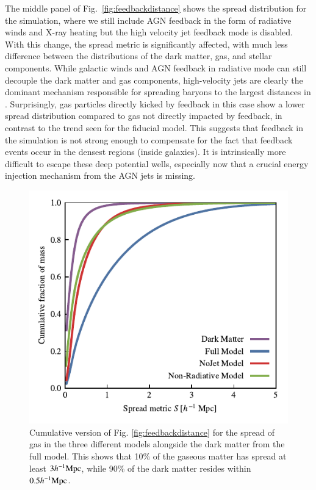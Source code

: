 The middle panel of Fig.~\ref{fig:feedbackdistance} shows the spread
distribution for the \nojet{} simulation, where we still include AGN feedback
in the form of radiative winds and X-ray heating but the high velocity jet
feedback mode is disabled. With this change, the spread metric is
significantly affected, with much less difference between the distributions
of the dark matter, gas, and stellar components. While galactic winds and AGN
feedback in radiative mode can still decouple the dark matter and gas
components, high-velocity jets are clearly the dominant mechanism responsible
for spreading baryons to the largest distances in \simba{}. Surprisingly, gas
particles directly kicked by feedback in this case show a lower spread
distribution compared to gas not directly impacted by feedback, in contrast
to the trend seen for the fiducial \simba{} model. This suggests that
feedback in the \nojet{} simulation is not strong enough to compensate for the
fact that feedback events occur in the densest regions (inside galaxies). It is
intrinsically more difficult to escape these deep potential wells, especially
now that a crucial energy injection mechanism from the AGN jets is missing.


\begin{figure}
    \centering
    \includegraphics{figures/cumulative_histogram_comparison.pdf}
    \vspace{-0.7cm}
    \caption{Cumulative version of Fig. \ref{fig:feedbackdistance} for the spread of gas
    in the three different models alongside the dark matter from the full model.
    This shows that 10\% of the gaseous matter has spread at least $3h^{-1}{\rm Mpc}{}$,
    while 90\% of the dark matter resides within $0.5 h^{-1}{\rm Mpc}{}$.}
    \label{fig:cumulativehistogram}
\end{figure}



